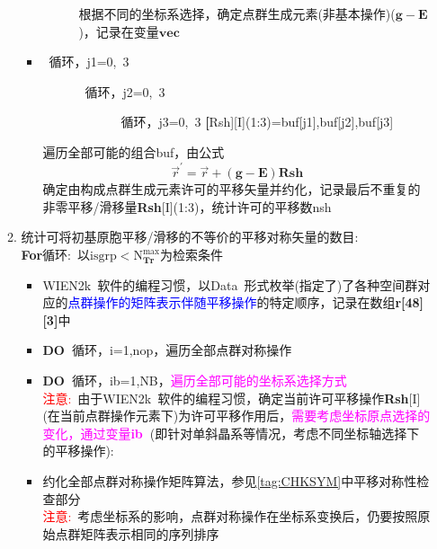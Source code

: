 \documentclass{article}      %
\begin{document}
\begin{itemize}
\begin{enumerate}
\begin{itemize}
\begin{description}
								根据不同的坐标系选择，确定点群生成元素(非基本操作)($\mathbf{g}-\mathbf{E}$)，记录在变量$\mathbf{vec}$
						\end{description}
				\end{itemize}
				\begin{itemize}
					\item {}~循环，\textrm{j1}=0,~3
						\begin{description}
							\item[] ~循环，\textrm{j2}=0,~3
								\begin{description}
									\item[] ~循环，\textrm{j3}=0,~3
									\textbf[Rsh][I](1:3)=\textrm{buf}[j1],\textrm{buf}[j2],\textrm{buf}[j3]
								\end{description}
						\end{description}
						遍历全部可能的组合\textrm{buf}，由公式
				\begin{displaymath}
					\vec r^{\prime}=\vec r+(\mathbf{g}-\mathbf{E})\mathbf{Rsh}
				\end{displaymath}
				确定由构成点群生成元素许可的平移矢量并约化，记录最后不重复的非零平移/滑移量\textbf{Rsh}[I](1:3)，统计许可的平移数\textrm{nsh}
				\end{itemize}
			\item 统计可将初基原胞平移/滑移的不等价的平移对称矢量的数目:~\\
				\textbf{For}循环:~以$\mathrm{isgrp}<\mathrm{N}_{\mathbf{Tr}}^{\mathrm{max}}$为检索条件
				\begin{itemize}
					\item \textrm{WIEN2k~}软件的编程习惯，以\textrm{Data~}形式枚举(指定了)了各种空间群对应的\textcolor{blue}{点群操作的矩阵表示伴随平移操作}的特定顺序，记录在数组\textbf{r[48][3]}中
							\item[] \textbf{DO~}循环，\textrm{i}=1,\textrm{nop}，遍历全部点群对称操作 
							\item[] \textbf{DO~}循环，\textrm{ib}=1,\textrm{NB}，\textcolor{magenta}{遍历全部可能的坐标系选择方式}\\
			\textcolor{red}{注意:~}由于\textrm{WIEN2k~}软件的编程习惯，确定当前许可平移操作\textbf{Rsh}[I](在当前点群操作元素下)为许可平移作用后，\textcolor{magenta}{需要考虑坐标原点选择的变化，通过变量\textbf{ib~}}(即针对单斜晶系等情况，考虑不同坐标轴选择下的平移操作):
					\item 约化全部点群对称操作矩阵算法，参见\ref{tag:CHKSYM}中平移对称性检查部分\\
						\textcolor{red}{注意:}~考虑坐标系的影响，点群对称操作在坐标系变换后，仍要按照原始点群矩阵表示相同的序列排序

\end{itemize}
\end{enumerate}
\end{itemize}
\end{document}
